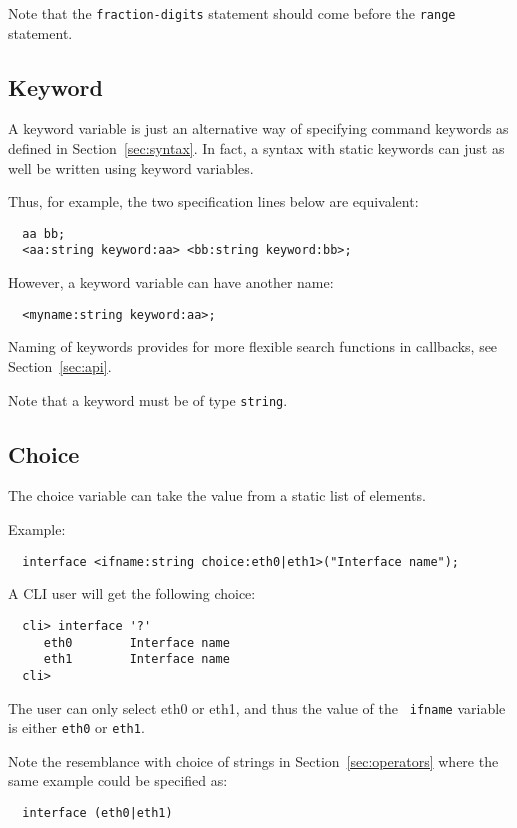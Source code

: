 \documentclass[a4paper, 10pt] {article}
\begin{document}
Note that the {\tt fraction-digits} statement should come before the {\tt range} statement.

\subsection{Keyword}
\label{sec:keyword}

A keyword variable is just an alternative way of specifying command
keywords as defined in Section~\ref{sec:syntax}. In fact, a syntax
with static keywords can just as well be written using keyword
variables. 

Thus, for example, the two specification lines below are equivalent:
\begin{verbatim}
  aa bb;
  <aa:string keyword:aa> <bb:string keyword:bb>;
\end{verbatim}

However, a keyword variable can have another name:
\begin{verbatim}
  <myname:string keyword:aa>;
\end{verbatim}

Naming of keywords provides for more flexible search functions
in callbacks, see Section~\ref{sec:api}.

Note that a keyword must be of type {\tt string}.

\subsection{Choice}

The choice variable can take the value from a static list of elements.

Example:
\begin{verbatim}
  interface <ifname:string choice:eth0|eth1>("Interface name");
\end{verbatim}

A CLI user will get the following choice:
\begin{verbatim}
  cli> interface '?'
     eth0        Interface name
     eth1        Interface name
  cli> 
\end{verbatim}
The user can only select eth0 or eth1, and thus the value of the {\tt
  ifname} variable is either {\tt eth0} or {\tt eth1}.

Note the resemblance with choice of strings in
Section~\ref{sec:operators} where the same example could be specified
as:
\begin{verbatim}
  interface (eth0|eth1)
\end{verbatim}
\end{document}
